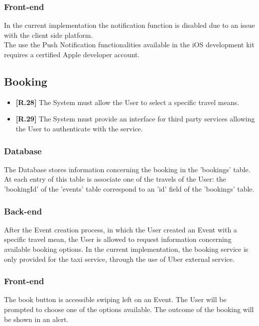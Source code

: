 \subsubsection*{Front-end}
In the current implementation the notification function is disabled due to an issue with the client side platform.\\
The use the Push Notification functionalities available in the iOS development kit requires a certified Apple developer account.

\subsection{Booking}
\begin{itemize}
\item {\color{OliveGreen}\textbf{[R.28]}} The System must allow the User to select a specific travel means.
\item {\color{OliveGreen}\textbf{[R.29]}} The System must provide an interface for third party services allowing the User to authenticate with the service.
\end{itemize}

\subsubsection*{Database}
The Database stores information concerning the booking in the 'bookings' table. At each entry of this table is associate one of the travels of the User: the 'bookingId' of the 'events' table correspond to an 'id' field of the 'bookings' table.

\subsubsection*{Back-end}
After the Event creation process, in which the User created an Event with a specific travel mean, the User is allowed to request information concerning available booking options. In the current implementation, the booking service is only provided for the taxi service, through the use of Uber external service.

\subsubsection*{Front-end}
The book button is accessible swiping left on an Event. 
The User will be prompted to choose one of the options available.
The outcome of the booking will be shown in an alert.